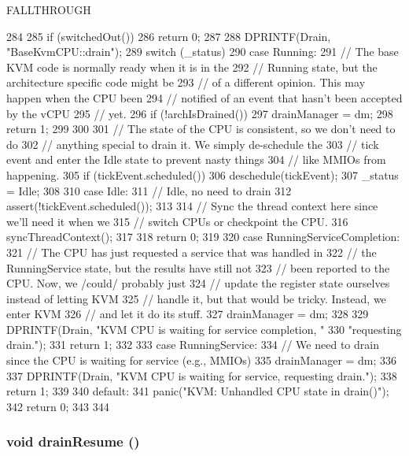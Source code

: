 FALLTHROUGH 


\begin{DoxyCode}
284 {
285     if (switchedOut())
286         return 0;
287 
288     DPRINTF(Drain, "BaseKvmCPU::drain\n");
289     switch (_status) {
290       case Running:
291         // The base KVM code is normally ready when it is in the
292         // Running state, but the architecture specific code might be
293         // of a different opinion. This may happen when the CPU been
294         // notified of an event that hasn't been accepted by the vCPU
295         // yet.
296         if (!archIsDrained()) {
297             drainManager = dm;
298             return 1;
299         }
300 
301         // The state of the CPU is consistent, so we don't need to do
302         // anything special to drain it. We simply de-schedule the
303         // tick event and enter the Idle state to prevent nasty things
304         // like MMIOs from happening.
305         if (tickEvent.scheduled())
306             deschedule(tickEvent);
307         _status = Idle;
308 
310       case Idle:
311         // Idle, no need to drain
312         assert(!tickEvent.scheduled());
313 
314         // Sync the thread context here since we'll need it when we
315         // switch CPUs or checkpoint the CPU.
316         syncThreadContext();
317 
318         return 0;
319 
320       case RunningServiceCompletion:
321         // The CPU has just requested a service that was handled in
322         // the RunningService state, but the results have still not
323         // been reported to the CPU. Now, we /could/ probably just
324         // update the register state ourselves instead of letting KVM
325         // handle it, but that would be tricky. Instead, we enter KVM
326         // and let it do its stuff.
327         drainManager = dm;
328 
329         DPRINTF(Drain, "KVM CPU is waiting for service completion, "
330                 "requesting drain.\n");
331         return 1;
332 
333       case RunningService:
334         // We need to drain since the CPU is waiting for service (e.g., MMIOs)
335         drainManager = dm;
336 
337         DPRINTF(Drain, "KVM CPU is waiting for service, requesting drain.\n");
338         return 1;
339 
340       default:
341         panic("KVM: Unhandled CPU state in drain()\n");
342         return 0;
343     }
344 }
\end{DoxyCode}
\hypertarget{classBaseKvmCPU_a8f020d3237536fe007fc488c4125c5d8}{
\subsubsection[{drainResume}]{\setlength{\rightskip}{0pt plus 5cm}void drainResume ()}}
\label{classBaseKvmCPU_a8f020d3237536fe007fc488c4125c5d8}



